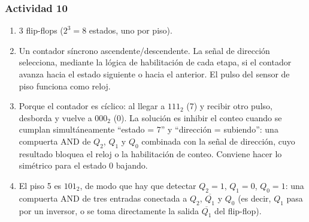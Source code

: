 \subsubsection*{Actividad 10}

\begin{enumerate}[label=\textbf{\alph*)}]
    \item 3 flip-flops ($2^3 = 8$ estados, uno por piso).
    \item Un contador síncrono ascendente/descendente. La señal de dirección selecciona, mediante la lógica de habilitación de cada etapa, si el contador avanza hacia el estado siguiente o hacia el anterior. El pulso del sensor de piso funciona como reloj.
    \item Porque el contador es cíclico: al llegar a $111_2$ (7) y recibir otro pulso, desborda y vuelve a $000_2$ (0). La solución es inhibir el conteo cuando se cumplan simultáneamente ``estado = 7'' y ``dirección = subiendo'': una compuerta AND de $Q_2$, $Q_1$ y $Q_0$ combinada con la señal de dirección, cuyo resultado bloquea el reloj o la habilitación de conteo. Conviene hacer lo simétrico para el estado 0 bajando.
    \item El piso 5 es $101_2$, de modo que hay que detectar $Q_2 = 1$, $Q_1 = 0$, $Q_0 = 1$: una compuerta AND de tres entradas conectada a $Q_2$, $\overline{Q_1}$ y $Q_0$ (es decir, $Q_1$ pasa por un inversor, o se toma directamente la salida $\overline{Q_1}$ del flip-flop).
\end{enumerate}
